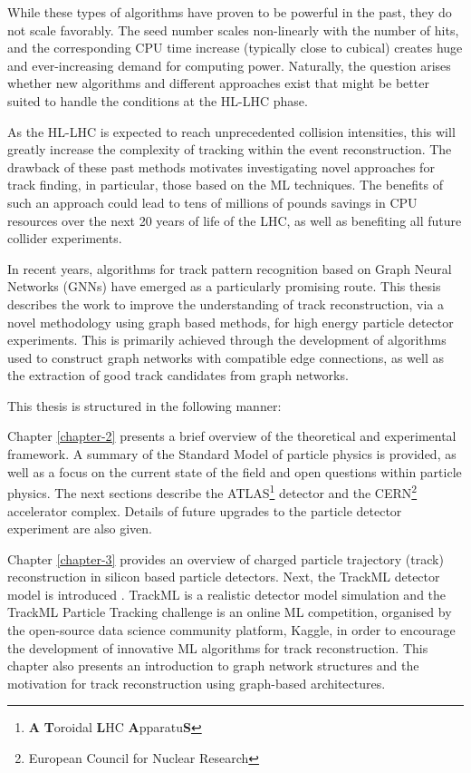 While these types of algorithms have proven to be powerful in the past, they do not scale favorably. The seed number scales non-linearly with the number of hits, and the corresponding CPU time increase (typically close to cubical) creates huge and ever-increasing demand for computing power. Naturally, the question arises whether new algorithms and different approaches exist that might be better suited to handle the conditions at the \ac{HL-LHC} phase.

As the \ac{HL-LHC} is expected to reach unprecedented collision intensities, this will greatly increase the complexity of tracking within the event reconstruction. The drawback of these past methods motivates investigating novel approaches for track finding, in particular, those based on the \ac{ML} techniques. The benefits of such an approach could lead to tens of millions of pounds savings in CPU resources over the next 20 years of life of the \ac{LHC}, as well as benefiting all future collider experiments.

In recent years, algorithms for track pattern recognition based on Graph Neural Networks (GNNs) have emerged as a particularly promising route. This thesis describes the work to improve the understanding of track reconstruction, via a novel methodology using graph based methods, for high energy particle detector experiments. This is primarily achieved through the development of algorithms used to construct graph networks with compatible edge connections, as well as the extraction of good track candidates from graph networks. 

This thesis is structured in the following manner:

Chapter \ref{chapter-2} presents a brief overview of the theoretical and experimental framework. A summary of the Standard Model of particle physics is provided, as well as a focus on the current state of the field and open questions within particle physics. The next sections describe the ATLAS\footnote[1]{\textbf{A} \textbf{T}oroidal \textbf{L}HC \textbf{A}pparatu\textbf{S}} detector and the CERN\footnote[2]{European Council for Nuclear Research} accelerator complex. Details of future upgrades to the particle detector experiment are also given.

Chapter \ref{chapter-3} provides an overview of charged particle trajectory (track) reconstruction in silicon based particle detectors. Next, the TrackML detector model is introduced \cite{kaggle-trackml}. TrackML is a realistic detector model simulation and the TrackML Particle Tracking challenge is an online \ac{ML} competition, organised by the open-source data science community platform, Kaggle, in order to encourage the development of innovative \ac{ML} algorithms for track reconstruction. This chapter also presents an introduction to graph network structures and the motivation for track reconstruction using graph-based architectures.

